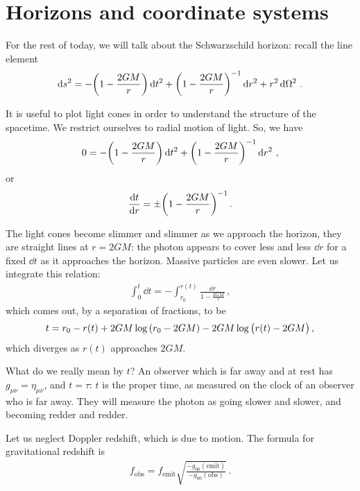 \documentclass[main.tex]{subfiles}
\begin{document}
\section{Horizons and coordinate systems}

For the rest of today, we will talk about the Schwarzschild horizon: recall the line element 
%
\begin{align}
  \dd{s^2} = - \qty(1- \frac{2GM}{r}) \dd{t^2}
  + \qty(1 - \frac{2GM}{r})^{-1} \dd{r^2} 
  + r^2 \dd{\Omega^2}
\,.
\end{align}
%

It is useful to plot light cones in order to understand the structure of the spacetime. 
We restrict ourselves to radial motion of light. So, we have 
%
\begin{align}
  0 = - \qty(1- \frac{2GM}{r}) \dd{t^2}
  + \qty(1 - \frac{2GM}{r})^{-1} \dd{r^2} 
\,,
\end{align}
%
or 
%
\begin{align}
  \dv{t}{r} = \pm \qty(1 - \frac{2GM}{r})^{-1}
\,.
\end{align}
%

The light cones become slimmer and slimmer as we approach the horizon, they are straight lines at \(r = 2GM\): the photon appears to cover less and less \(\dd{r}\) for a fixed \(\dd{t}\) as it approaches the horizon. 
Massive particles are even slower. 
Let us integrate this relation: 
%
\begin{align}
  \int_0^t \dd{t} = - \int_{r_0}^{r(t)} \frac{\dd{r}}{1 - \frac{2GM}{r}} 
\,,
\end{align}
%
which comes out, by a separation of fractions, to be 
%
\begin{align}
  t = r_0 - r(t) + 2GM \log \qty(r_0 - 2GM) - 2GM \log \qty(r(t) - 2GM)
\,,
\end{align}
%
which diverges as \(r(t)\) approaches \(2GM\). 

What do we really mean by \(t\)? 
An observer which is far away and at rest has \(g_{\mu \nu } = \eta_{\mu \nu }\), and \(t = \tau \): \(t\) is the proper time, as measured on the clock of an observer who is far away. 
They will measure the photon as going slower and slower, and becoming redder and redder. 

Let us neglect Doppler redshift, which is due to motion. 
The formula for gravitational redshift is 
%
\begin{align}
  f _{\text{obs}} = f _{\text{emit}} \sqrt{\frac{- g_{00} (\text{emit})}{-g_{00} (\text{obs})}}
\,.
\end{align}
%
\end{document}
